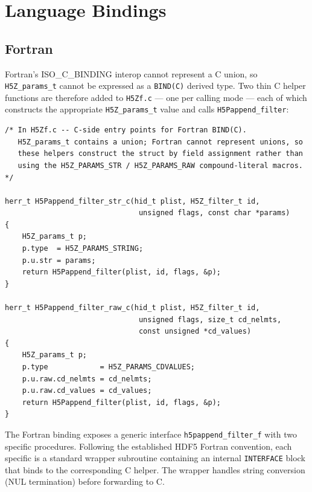 \documentclass[../RFC-HDFG-2026-001.tex]{subfiles}
\begin{document}
\section{Language Bindings}
\label{sec:bindings}

\subsection{Fortran}
\label{sec:fortran-bindings}

Fortran's ISO\_C\_BINDING interop cannot represent a C union, so
\texttt{H5Z\_params\_t} cannot be expressed as a \texttt{BIND(C)} derived
type.  Two thin C helper functions are therefore added to
\texttt{H5Zf.c} --- one per calling mode --- each of which constructs the
appropriate \texttt{H5Z\_params\_t} value and calls
\texttt{H5Pappend\_filter}:

\begin{verbatim}
/* In H5Zf.c -- C-side entry points for Fortran BIND(C).
   H5Z_params_t contains a union; Fortran cannot represent unions, so
   these helpers construct the struct by field assignment rather than
   using the H5Z_PARAMS_STR / H5Z_PARAMS_RAW compound-literal macros. */

herr_t H5Pappend_filter_str_c(hid_t plist, H5Z_filter_t id,
                               unsigned flags, const char *params)
{
    H5Z_params_t p;
    p.type  = H5Z_PARAMS_STRING;
    p.u.str = params;
    return H5Pappend_filter(plist, id, flags, &p);
}

herr_t H5Pappend_filter_raw_c(hid_t plist, H5Z_filter_t id,
                               unsigned flags, size_t cd_nelmts,
                               const unsigned *cd_values)
{
    H5Z_params_t p;
    p.type            = H5Z_PARAMS_CDVALUES;
    p.u.raw.cd_nelmts = cd_nelmts;
    p.u.raw.cd_values = cd_values;
    return H5Pappend_filter(plist, id, flags, &p);
}
\end{verbatim}

The Fortran binding exposes a generic interface
\texttt{h5pappend\_filter\_f} with two specific procedures.  Following the
established HDF5 Fortran convention, each specific is a standard wrapper
subroutine containing an internal \texttt{INTERFACE} block that binds to the
corresponding C helper.  The wrapper handles string conversion (NUL
termination) before forwarding to C.
\end{document}
